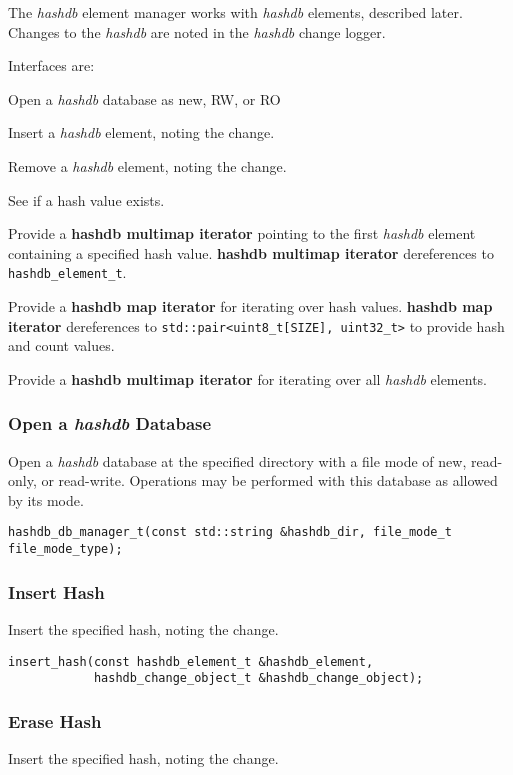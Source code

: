 \documentclass[12pt,twoside]{article}
\newcommand{\hdb}{\emph{hashdb}\xspace}
\newcommand{\hmi}{\textbf{hashdb map iterator}\xspace}
\newcommand{\hmmi}{\textbf{hashdb multimap iterator}\xspace}
\begin{document}
The \hdb element manager works with \hdb elements, described later.
Changes to the \hdb are noted in the \hdb change logger.

Interfaces are:
\begin{compactitem}
\item Open a \hdb database as new, RW, or RO
\item Insert a \hdb element, noting the change.
\item Remove a \hdb element, noting the change.
\item See if a hash value exists.
\item Provide a \hmmi pointing to the first \hdb element
containing a specified hash value.
\hmmi dereferences to \texttt{hashdb\_element\_t}.
\item Provide a \hmi for iterating over hash values.
\hmi dereferences to \texttt{std::pair<uint8\_t[SIZE], uint32\_t>}
to provide hash and count values.
\item Provide a \hmmi for iterating over all \hdb elements.
\end{compactitem}

\subsubsection{Open a \hdb Database}
Open a \hdb database at the specified directory
with a file mode of new, read-only, or read-write.
Operations may be performed with this database as allowed by its mode.

\begin{small}
\begin{verbatim}
hashdb_db_manager_t(const std::string &hashdb_dir, file_mode_t file_mode_type);
\end{verbatim}
\end{small}

\subsubsection{Insert Hash}
Insert the specified hash, noting the change.

\begin{small}
\begin{verbatim}
insert_hash(const hashdb_element_t &hashdb_element,
            hashdb_change_object_t &hashdb_change_object);
\end{verbatim}
\end{small}

\subsubsection{Erase Hash}
Insert the specified hash, noting the change.
\end{document}
